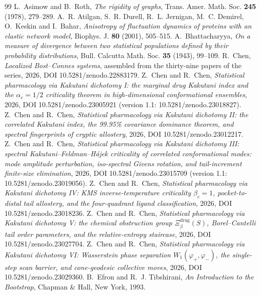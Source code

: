 \documentclass[11pt,reqno]{amsart}
\theoremstyle{plain}
\theoremstyle{definition}
\theoremstyle{remark}
\numberwithin{equation}{section}
\begin{document}
\begin{thebibliography}{99}
 L.~Asimow and B.~Roth, \emph{The rigidity of graphs}, Trans. Amer. Math. Soc. \textbf{245} (1978), 279--289.
 A.~R. Atilgan, S.~R. Durell, R.~L. Jernigan, M.~C. Demirel, O.~Keskin and I.~Bahar, \emph{Anisotropy of fluctuation dynamics of proteins with an elastic network model}, Biophys. J. \textbf{80} (2001), 505--515.
 A.~Bhattacharyya, \emph{On a measure of divergence between two statistical populations defined by their probability distributions}, Bull. Calcutta Math. Soc. \textbf{35} (1943), 99--109.
 R.~Chen, \emph{Localized Bost--Connes systems}, assembled from the thirty-nine papers of the series, 2026, DOI 10.5281/zenodo.22883179.
 Z.~Chen and R.~Chen, \emph{Statistical pharmacology via Kakutani dichotomy I: the marginal drug Kakutani index and the $\alpha_c=1/2$ criticality theorem in high-dimensional conformational ensembles}, 2026, DOI 10.5281/zenodo.23005921 (version 1.1: 10.5281/zenodo.23018827).
 Z.~Chen and R.~Chen, \emph{Statistical pharmacology via Kakutani dichotomy II: the correlated Kakutani index, the 99.95\% covariance dominance theorem, and spectral fingerprints of cryptic allostery}, 2026, DOI 10.5281/zenodo.23012217.
 Z.~Chen and R.~Chen, \emph{Statistical pharmacology via Kakutani dichotomy III: spectral Kakutani--Feldman--H\'ajek criticality of correlated conformational modes: mode amplitude perturbation, iso-spectral Givens rotation, and tail-increment finite-size elimination}, 2026, DOI 10.5281/zenodo.23015709 (version 1.1: 10.5281/zenodo.23019056).
 Z.~Chen and R.~Chen, \emph{Statistical pharmacology via Kakutani dichotomy IV: KMS inverse-temperature criticality $\beta_c=1$, pocket-to-distal tail allostery, and the four-quadrant ligand classification}, 2026, DOI 10.5281/zenodo.23018236.
 Z.~Chen and R.~Chen, \emph{Statistical pharmacology via Kakutani dichotomy V: the chemical obstruction group $\Xi_\beta^{\mathrm{drug}}(S)$, Borel--Cantelli tail order parameters, and the relative-entropy staircase}, 2026, DOI 10.5281/zenodo.23027704.
 Z.~Chen and R.~Chen, \emph{Statistical pharmacology via Kakutani dichotomy VI: Wasserstein phase separation $W_1(\varphi_+,\varphi_-)$, the single-step scan barrier, and cone-geodesic collective moves}, 2026, DOI 10.5281/zenodo.23029360.
 B.~Efron and R.~J. Tibshirani, \emph{An Introduction to the Bootstrap}, Chapman \& Hall, New York, 1993.

\end{thebibliography}
\end{document}
